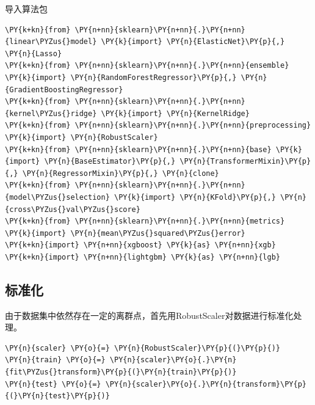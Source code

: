 \documentclass[no-math]{YangThesis}
\begin{document}
导入算法包

\begin{tcolorbox}[breakable, size=fbox, boxrule=1pt, pad at break*=1mm,colback=cellbackground, colframe=cellborder]
	\begin{Verbatim}[commandchars=\\\{\}]
\PY{k+kn}{from} \PY{n+nn}{sklearn}\PY{n+nn}{.}\PY{n+nn}{linear\PYZus{}model} \PY{k}{import} \PY{n}{ElasticNet}\PY{p}{,} \PY{n}{Lasso}
\PY{k+kn}{from} \PY{n+nn}{sklearn}\PY{n+nn}{.}\PY{n+nn}{ensemble} \PY{k}{import} \PY{n}{RandomForestRegressor}\PY{p}{,} \PY{n}{GradientBoostingRegressor}
\PY{k+kn}{from} \PY{n+nn}{sklearn}\PY{n+nn}{.}\PY{n+nn}{kernel\PYZus{}ridge} \PY{k}{import} \PY{n}{KernelRidge}
\PY{k+kn}{from} \PY{n+nn}{sklearn}\PY{n+nn}{.}\PY{n+nn}{preprocessing} \PY{k}{import} \PY{n}{RobustScaler}
\PY{k+kn}{from} \PY{n+nn}{sklearn}\PY{n+nn}{.}\PY{n+nn}{base} \PY{k}{import} \PY{n}{BaseEstimator}\PY{p}{,} \PY{n}{TransformerMixin}\PY{p}{,} \PY{n}{RegressorMixin}\PY{p}{,} \PY{n}{clone}
\PY{k+kn}{from} \PY{n+nn}{sklearn}\PY{n+nn}{.}\PY{n+nn}{model\PYZus{}selection} \PY{k}{import} \PY{n}{KFold}\PY{p}{,} \PY{n}{cross\PYZus{}val\PYZus{}score}
\PY{k+kn}{from} \PY{n+nn}{sklearn}\PY{n+nn}{.}\PY{n+nn}{metrics} \PY{k}{import} \PY{n}{mean\PYZus{}squared\PYZus{}error}
\PY{k+kn}{import} \PY{n+nn}{xgboost} \PY{k}{as} \PY{n+nn}{xgb}
\PY{k+kn}{import} \PY{n+nn}{lightgbm} \PY{k}{as} \PY{n+nn}{lgb}
	\end{Verbatim}
\end{tcolorbox}

\hypertarget{ux6807ux51c6ux5316}{%
	\subsection{标准化}\label{ux6807ux51c6ux5316}}

由于数据集中依然存在一定的离群点，首先用RobustScaler对数据进行标准化处理。

\begin{tcolorbox}[breakable, size=fbox, boxrule=1pt, pad at break*=1mm,colback=cellbackground, colframe=cellborder]
	\begin{Verbatim}[commandchars=\\\{\}]
\PY{n}{scaler} \PY{o}{=} \PY{n}{RobustScaler}\PY{p}{(}\PY{p}{)}
\PY{n}{train} \PY{o}{=} \PY{n}{scaler}\PY{o}{.}\PY{n}{fit\PYZus{}transform}\PY{p}{(}\PY{n}{train}\PY{p}{)}
\PY{n}{test} \PY{o}{=} \PY{n}{scaler}\PY{o}{.}\PY{n}{transform}\PY{p}{(}\PY{n}{test}\PY{p}{)}
	\end{Verbatim}
\end{tcolorbox}
\end{document}

